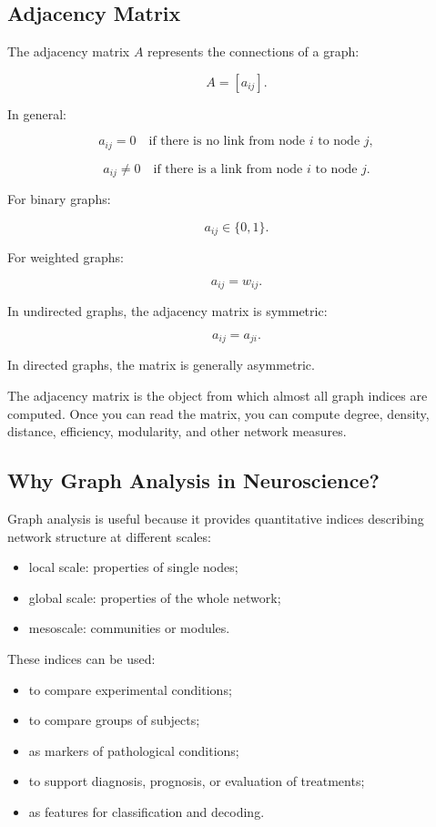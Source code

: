 \subsection{Adjacency Matrix}

The adjacency matrix $A$ represents the connections of a graph:

\[
A = [a_{ij}].
\]

In general:

\[
a_{ij} = 0
\quad \text{if there is no link from node } i \text{ to node } j,
\]

\[
a_{ij} \neq 0
\quad \text{if there is a link from node } i \text{ to node } j.
\]

For binary graphs:

\[
a_{ij} \in \{0,1\}.
\]

For weighted graphs:

\[
a_{ij} = w_{ij}.
\]

In undirected graphs, the adjacency matrix is symmetric:

\[
a_{ij} = a_{ji}.
\]

In directed graphs, the matrix is generally asymmetric.

\begin{authornote}
The adjacency matrix is the object from which almost all graph indices are computed. Once you can read the matrix, you can compute degree, density, distance, efficiency, modularity, and other network measures.
\end{authornote}

\subsection{Why Graph Analysis in Neuroscience?}

Graph analysis is useful because it provides quantitative indices describing network structure at different scales:

\begin{itemize}[noitemsep]
    \item local scale: properties of single nodes;
    \item global scale: properties of the whole network;
    \item mesoscale: communities or modules.
\end{itemize}

These indices can be used:

\begin{itemize}[noitemsep]
    \item to compare experimental conditions;
    \item to compare groups of subjects;
    \item as markers of pathological conditions;
    \item to support diagnosis, prognosis, or evaluation of treatments;
    \item as features for classification and decoding.
\end{itemize}

